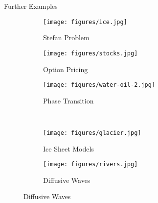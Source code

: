 \documentclass[aspectratio=169,xcolor=dvipsnames,11pt]{beamer}
\begin{document}
\begin{frame}{Further Examples}
\begin{figure}
  \centering
  \begin{subfigure}[b]{0.19\textwidth}
    \texttt{[image: figures/ice.jpg]}
    \caption{Stefan Problem}
  \end{subfigure}
  \hfill
  \begin{subfigure}[b]{0.19\textwidth}
    \texttt{[image: figures/stocks.jpg]}
    \caption{Option Pricing}
  \end{subfigure}
  \hfill
  \begin{subfigure}[b]{0.19\textwidth}
    \texttt{[image: figures/water-oil-2.jpg]}
    \caption{Phase Transition}
  \end{subfigure}\\
  \begin{subfigure}[b]{0.19\textwidth}
    \texttt{[image: figures/glacier.jpg]}
    \caption{Ice Sheet Models}
  \end{subfigure}
\hspace{7em}	
  \begin{subfigure}[b]{0.19\textwidth}
    \texttt{[image: figures/rivers.jpg]}
    \caption{Diffusive Waves}
  \end{subfigure}
\end{figure}
\end{frame}

\end{document}

